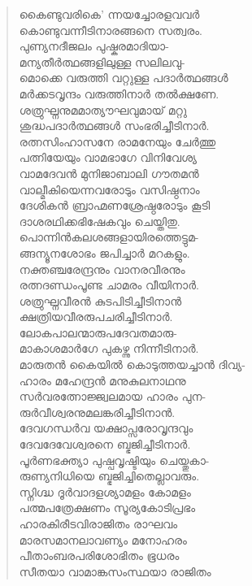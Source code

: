 \begin{verse}
കൈണ്ടുവരികെ’ ന്നയച്ചോരളവവര്‍\\
കൊണ്ടുവന്നീടിനാരങ്ങനെ സത്വരം.\\
പുണ്യനദീജലം പുഷ്കരമാദിയാ-\\
മന്യതീര്‍ത്ഥങ്ങളിലുള്ള സലിലവു-\\
മൊക്കെ വരുത്തി വറ്റുള്ള പദാര്‍ത്ഥങ്ങള്‍\\
മര്‍ക്കടവൃന്ദം വരുത്തിനാര്‍ തല്‍ക്ഷണേ.\\
ശത്രുഘ്നനുമമാത്യൗഘവുമായ് മറ്റു\\
ശുദ്ധപദാര്‍ത്ഥങ്ങള്‍ സംഭരിച്ചീടിനാര്‍.\\
രത്നസിംഹാസനേ രാമനേയും ചേര്‍ത്തു\\
പത്നിയേയും വാമഭാഗേ വിനിവേശ്യ\\
വാമദേവന്‍ മുനിജാബാലി ഗൗതമന്‍\\
വാല്മീകിയെന്നവരോടും വസിഷ്ഠനാം\\
ദേശികന്‍ ബ്രാഹ്മണശ്രേഷ്ഠരോടും കൂടി\\
ദാശരഥിക്കഭിഷേകവും ചെയ്തിതു.\\
പൊന്നിന്‍കലശങ്ങളായിരത്തെട്ടുമ-\\
ങ്ങന്യൂനശോഭം ജപിച്ചാര്‍ മറകളും.\\
നക്തഞ്ചരേന്ദ്രനും വാനരവീരനും\\
രത്നദണ്ഡംപൂണ്ട ചാമരം വീയിനാര്‍.\\
ശത്രുഘ്നവീരന്‍ കുടപിടിച്ചീടിനാന്‍\\
ക്ഷത്രിയവീരരുപചരിച്ചീടിനാര്‍.\\
ലോകപാലന്മാരുപദേവതമാരു-\\
മാകാശമാര്‍ഗേ പുകഴ്ന്നു നിന്നീടിനാര്‍.\\
മാരുതന്‍ കൈയില്‍ കൊടുത്തയച്ചാന്‍ ദിവ്യ-\\
ഹാരം മഹേന്ദ്രന്‍ മനുകുലനാഥനു\\
സര്‍വരത്നോജ്ജ്വലമായ ഹാരം പുന-\\
രുര്‍വീശ്വരനുമലങ്കരിച്ചീടിനാന്‍.\\
ദേവഗന്ധര്‍വ യക്ഷാപ്സരോവൃന്ദവും\\
ദേവദേവേശ്വരനെ ബ്ഭജിച്ചീടിനാര്‍.\\
പൂര്‍ണഭക്ത്യാ പുഷ്പവൃഷ്ടിയും ചെയ്തുകാ-\\
രുണ്യനിധിയെ ബ്ഭജിച്ചിതെല്ലാവരും.\\
സ്നിഗ്ദ്ധ ദൂര്‍വാദളശ്യാമളം കോമളം\\
പത്മപത്രേക്ഷണം സൂര്യകോടിപ്രഭം\\
ഹാരകിരീടവിരാജിതം രാഘവം\\
മാരസമാനലാവണ്യം മനോഹരം\\
പീതാംബരപരിശോഭിതം ഭൂധരം\\
സീതയാ വാമാങ്കസംസ്ഥയാ രാജിതം\\

\end{verse}
